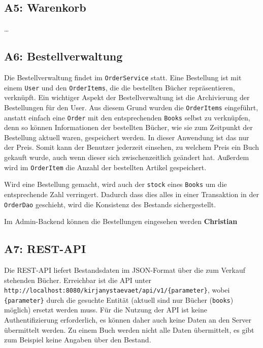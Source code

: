 	\subsection{A5: Warenkorb}\label{sec:umsetzung:cart}
	\dots
	
	\subsection{A6: Bestellverwaltung}\label{sec:umsetzung:Bestellverwaltung}
	Die Bestellverwaltung findet im \texttt{OrderService} statt. Eine Bestellung ist mit einem \texttt{User} und den \texttt{OrderItems}, die die bestellten Bücher repräsentieren, verknüpft. Ein wichtiger Aspekt der Bestellverwaltung ist die Archivierung der Bestellungen für den User. Aus diesem Grund wurden die \texttt{OrderItems} eingeführt, anstatt einfach eine \texttt{Order} mit den entsprechenden \texttt{Books} selbst zu verknüpfen, denn so können Informationen der bestellten Bücher, wie sie zum Zeitpunkt der Bestellung aktuell waren, gespeichert werden. In dieser Anwendung ist das nur der Preis. Somit kann der Benutzer jederzeit einsehen, zu welchem Preis ein Buch gekauft wurde, auch wenn dieser sich zwischenzeitlich geändert hat. Außerdem wird im \texttt{OrderItem} die Anzahl der bestellten Artikel gespeichert.
	
	Wird eine Bestellung gemacht, wird auch der \texttt{stock} eines \texttt{Books} um die entsprechende Zahl verringert. Dadurch dass dies alles in einer Transaktion in der \texttt{OrderDao} geschieht, wird die Konsistenz des Bestands sichergestellt.
	
	Im Admin-Backend können die Bestellungen eingesehen werden \textbf{Christian}
	
	\subsection{A7: REST-API}\label{sec:umsetzung:API}
	Die REST-API liefert Bestandsdaten im JSON-Format über die zum Verkauf stehenden Bücher. Erreichbar ist die API unter \lstinline|http://localhost:8080/kirjanystaevaet/api/v1/{parameter}|, wobei \lstinline|{parameter}| durch die gesuchte Entität (aktuell sind nur Bücher (\lstinline|books|) möglich) ersetzt werden muss. Für die Nutzung der API ist keine Authentifizierung erforderlich, es können daher auch keine Daten an den Server übermittelt werden. Zu einem Buch werden nicht alle Daten übermittelt, es gibt zum Beispiel keine Angaben über den Bestand.
	

